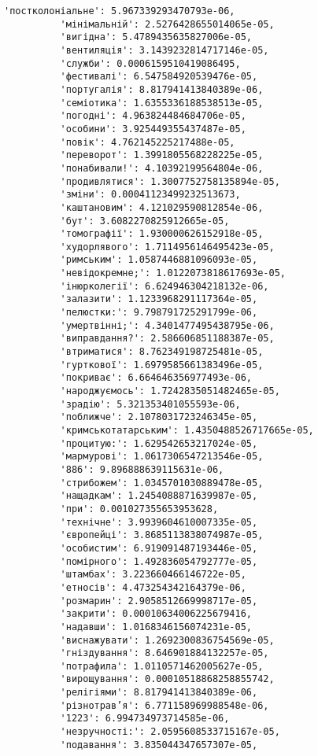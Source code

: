 \documentclass[11pt]{article}
\begin{document}
\begin{Verbatim}[commandchars=\\\{\}]
          'постколоніальне': 5.967339293470793e-06,
          'мінімальній': 2.5276428655014065e-05,
          'вигідна': 5.4789435635827006e-05,
          'вентиляція': 3.1439232814717146e-05,
          'служби': 0.0006159510419086495,
          'фестивалі': 6.547584920539476e-05,
          'португалія': 8.817941413840389e-06,
          'семіотика': 1.6355336188538513e-05,
          'погодні': 4.963824484684706e-05,
          'особини': 3.925449355437487e-05,
          'повік': 4.762145225217488e-05,
          'переворот': 1.3991805568228225e-05,
          'понабивали!': 4.10392199564804e-06,
          'продивлятися': 1.3007752758135894e-05,
          'зміни': 0.00041123499232513673,
          'каштановим': 4.121029590812854e-06,
          'бут': 3.6082270825912665e-05,
          'томографії': 1.930000626152918e-05,
          'худорлявого': 1.7114956146495423e-05,
          'римським': 1.0587446881096093e-05,
          'невідокремне;': 1.0122073818617693e-05,
          'інюрколегії': 6.624946304218132e-06,
          'залазити': 1.1233968291117364e-05,
          'пелюстки:': 9.798791725291799e-06,
          'умертвінні;': 4.3401477495438795e-06,
          'виправдання?': 2.586606851188387e-05,
          'втриматися': 8.762349198725481e-05,
          'гурткової': 1.6979585661383496e-05,
          'покриває': 6.664646356977493e-06,
          'народжуємось': 1.7242835051482465e-05,
          'зрадію': 5.321353401055593e-06,
          'поближче': 2.1078031723246345e-05,
          'кримськотатарським': 1.4350488526717665e-05,
          'процитую:': 1.629542653217024e-05,
          'мармурові': 1.0617306547213546e-05,
          '886': 9.896888639115631e-06,
          'стрибожем': 1.0345701030889478e-05,
          'нащадкам': 1.2454088871639987e-05,
          'при': 0.001027355653953628,
          'технічне': 3.9939604610007335e-05,
          'європейці': 3.8685113838074987e-05,
          'особистим': 6.919091487193446e-05,
          'помірного': 1.492836054792777e-05,
          'штамбах': 3.223660466146722e-05,
          'етносів': 4.473254342164379e-06,
          'розмарин': 2.9058512669998717e-05,
          'закрити': 0.00010634006225679416,
          'надавши': 1.0168346156074231e-05,
          'виснажувати': 1.2692300836754569e-05,
          'гніздування': 8.646901884132257e-05,
          'потрафила': 1.0110571462005627e-05,
          'вирощування': 0.00010518868258855742,
          'релігіями': 8.817941413840389e-06,
          'різнотрав’я': 6.771158969988548e-06,
          '1223': 6.994734973714585e-06,
          'незручності:': 2.0595608533715167e-05,
          'подавання': 3.835044347657307e-05,

\end{Verbatim}
\end{document}
